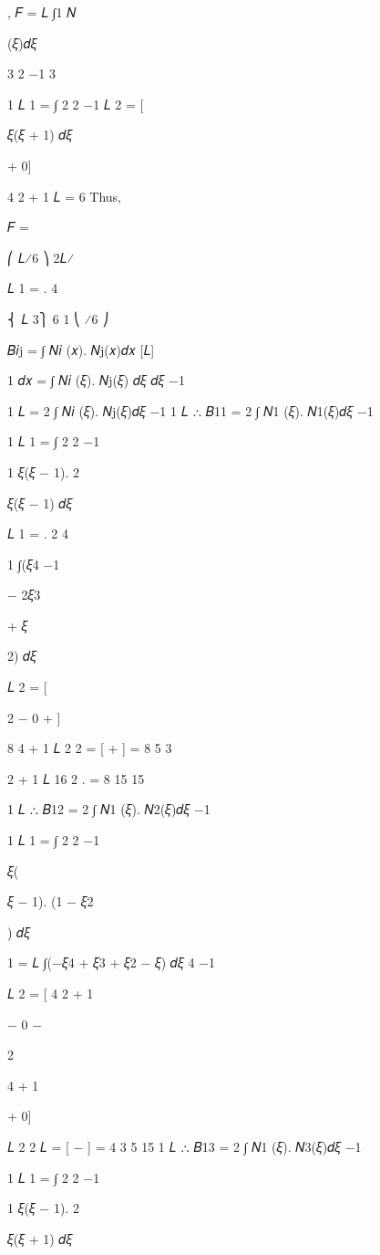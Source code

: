 {{{{{ 
,	𝐹 = 𝐿 ∫1 𝑁
 
(𝜉)𝑑𝜉
 
3	2 −1  3

 
1
𝐿	1
=   ∫  
2	2
−1
𝐿	2
=   [
 

𝜉(𝜉 + 1) 𝑑𝜉


+ 0]
 
4 2 + 1
𝐿
=  
6
Thus,

 

{𝐹} =
 
⎛ 𝐿⁄6 ⎞
2𝐿⁄
 

𝐿	1
=   . {4}
 
⎨ 𝐿  3⎫	6	1
⎝ ⁄6 ⎠



𝐵𝑖j = ∫ 𝑁𝑖 (𝑥). 𝑁j(𝑥)𝑑𝑥
[𝐿]

1
𝑑𝑥
= ∫ 𝑁𝑖 (𝜉). 𝑁j(𝜉) 𝑑𝜉 𝑑𝜉
−1
 
1
𝐿
= 2 ∫ 𝑁𝑖 (𝜉). 𝑁j(𝜉)𝑑𝜉
−1
1
𝐿
∴ 𝐵11 = 2 ∫ 𝑁1 (𝜉). 𝑁1(𝜉)𝑑𝜉
−1
 
1
𝐿	1
=   ∫  
2	2
−1
 

1
𝜉(𝜉 − 1).  
2
 

𝜉(𝜉 − 1) 𝑑𝜉
 

 
𝐿 1
=   .  
2 4
 
1
∫(𝜉4
−1
 

− 2𝜉3
 

+ 𝜉
 

2) 𝑑𝜉
 

 
𝐿	2
=   [
 
2
− 0 +	]
 
8 4 + 1
𝐿 2	2
=   [  +  ] =
8 5	3
 
2 + 1
𝐿   16		2   .	=
8 15	15
 
1
𝐿
∴ 𝐵12 = 2 ∫ 𝑁1 (𝜉). 𝑁2(𝜉)𝑑𝜉
−1
 
1
𝐿	1
=   ∫  
2	2
−1
 

𝜉(
 

𝜉 − 1). (1 − 𝜉2
 

) 𝑑𝜉
 
1
= 𝐿 ∫(−𝜉4 + 𝜉3 + 𝜉2 − 𝜉) 𝑑𝜉 4
−1

 
𝐿	2
=   [
4 2 + 1
 
− 0 −
 
2

 
4 + 1
 
+ 0]
 
𝐿 2	2	𝐿
=   [  −  ] =
4 3	5	15
1
𝐿
∴ 𝐵13 = 2 ∫ 𝑁1 (𝜉). 𝑁3(𝜉)𝑑𝜉
−1
 
1
𝐿	1
=   ∫  
2	2
−1
 

1
𝜉(𝜉 − 1).  
2
 

𝜉(𝜉 + 1) 𝑑𝜉
 
}}}}}
